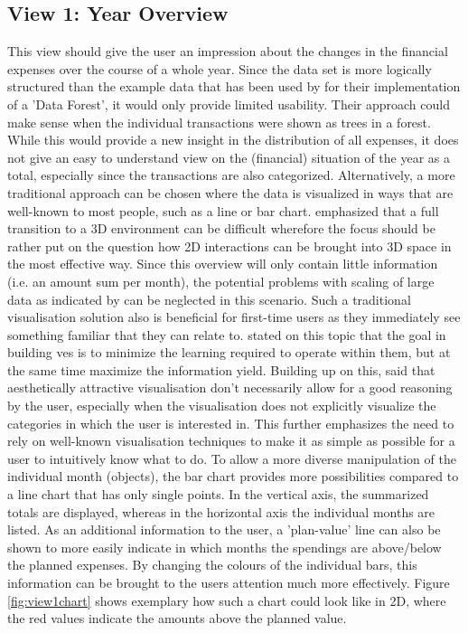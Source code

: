 
\subsection{View 1: Year Overview}

This view should give the user an impression about the changes in the financial expenses over the course of a whole year. Since the data set is more logically structured than the example data that has been used by \cite{Jamieson2007} for their implementation of a 'Data Forest', it would only provide limited usability. Their approach could make sense when the individual transactions were shown as trees in a forest. While this would provide a new insight in the distribution of all expenses, it does not give an easy to understand view on the (financial) situation of the year as a total, especially since the transactions are also categorized. \newline
Alternatively, a more traditional approach can be chosen where the data is visualized in ways that are well-known to most people, such as a line or bar chart. \cite{Drouhard2015} emphasized that a full transition to a 3D environment can be difficult wherefore the focus should be rather put on the question how 2D interactions can be brought into 3D space in the most effective way. Since this overview will only contain little information (i.e. an amount sum per month), the potential problems with scaling of large data as indicated by \cite{Jamieson2007} can be neglected in this scenario. Such a traditional visualisation solution also is beneficial for first-time users as they immediately see something familiar that they can relate to. \cite{Wann1996} stated on this topic that the goal in building \glspl{ve} is to minimize the learning required to operate within them, but at the same time maximize the information yield. Building up on this, \cite{Burlutskiy2014a} said that aesthetically attractive visualisation don't necessarily allow for a good reasoning by the user, especially when the visualisation does not explicitly visualize the categories in which the user is interested in. This further emphasizes the need to rely on well-known visualisation techniques to make it as simple as possible for a user to intuitively know what to do. \newline
To allow a more diverse manipulation of the individual month (objects), the bar chart provides more possibilities compared to a line chart that has only single points. In the vertical axis, the summarized totals are displayed, whereas in the horizontal axis the individual months are listed. As an additional information to the user, a 'plan-value' line can also be shown to more easily indicate in which months the spendings are above/below the planned expenses. By changing the colours of the individual bars, this information can be brought to the users attention much more effectively. Figure \ref{fig:view1chart} shows exemplary how such a chart could look like in 2D, where the red values indicate the amounts above the planned value.

